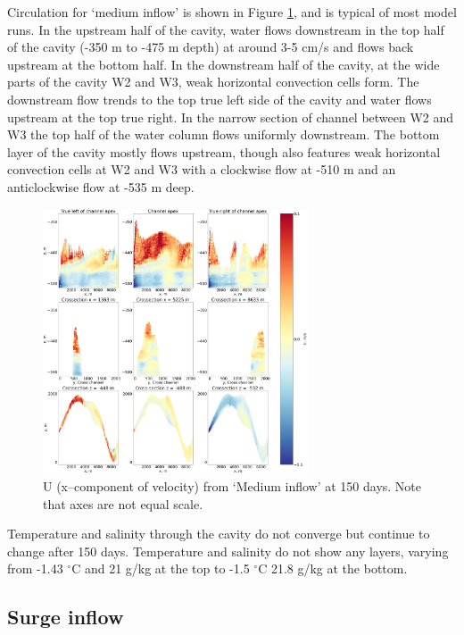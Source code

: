 Circulation for `medium inflow' is shown in Figure \ref{fig:medium_flow_circulation}, and is typical of most model runs.
In the upstream half of the cavity, water flows downstream in the top half of the cavity (-350 m to -475 m depth) at around 3-5 cm/s and flows back upstream at the bottom half. In the downstream half of the cavity, at the wide parts of the cavity W2 and W3, weak horizontal convection cells form. The downstream flow trends to the top true left side of the cavity and water flows upstream at the top true right. In the narrow section of channel between W2 and W3 the top half of the water column flows uniformly downstream. 
The bottom layer of the cavity mostly flows upstream, though also features weak horizontal convection cells at W2 and W3 with a clockwise flow at -510 m and an anticlockwise flow at -535 m deep. 

\begin{figure}[!ht]
\centering
\includegraphics[width=0.7\textwidth]{chapters/4/medium_flow_circulation.png}
\caption[]{U (x--component of velocity) from `Medium inflow' at 150 days. Note that axes are not equal scale.}
\label{fig:medium_flow_circulation}
\end{figure}


Temperature and salinity through the cavity do not converge but continue to change after 150 days. Temperature and salinity do not show any layers, varying from -1.43 $^{\circ}$C and 21  g/kg at the top to -1.5 $^{\circ}$C 21.8  g/kg at the bottom. 

\subsection{Surge inflow} \label{sec:surge_inflow}



